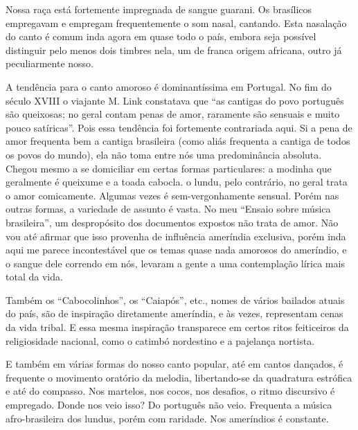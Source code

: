Nossa raça está fortemente impregnada de sangue guarani. Os brasílicos
empregavam e empregam frequentemente o som nasal, cantando. Esta
nasalação do canto é comum inda agora em quase todo o país, embora seja
possível distinguir pelo menos dois timbres nela, um de franca origem
africana, outro já peculiarmente nosso.

A tendência para o canto amoroso é dominantíssima em Portugal. No fim do
século XVIII o viajante M. Link constatava que ``as cantigas do povo
português são queixosas; no geral contam penas de amor, raramente são
sensuais e muito pouco satíricas''. Pois essa tendência foi fortemente
contrariada aqui. Si a pena de amor frequenta bem a cantiga brasileira
(como aliás frequenta a cantiga de todos os povos do mundo), ela não
toma entre nós uma predominância absoluta. Chegou mesmo a se domiciliar
em certas formas particulares: a modinha que geralmente é queixume e a
toada cabocla. o lundu, pelo contrário, no geral trata o amor
comicamente. Algumas vezes é sem-vergonhamente sensual. Porém nas outras
formas, a variedade de assunto é vasta. No meu ``Ensaio sobre música
brasileira'', um despropósito dos documentos expostos não trata de amor.
Não vou até afirmar que isso provenha de influência ameríndia exclusiva,
porém inda aqui me parece incontestável que os temas quase nada amorosos
do ameríndio, e o sangue dele correndo em nós, levaram a gente a uma
contemplação lírica mais total da vida.

Também os ``Cabocolinhos'', os ``Caiapós'', etc., nomes de vários
bailados atuais do país, são de inspiração diretamente ameríndia, e às
vezes, representam cenas da vida tribal. E essa mesma inspiração
transparece em certos ritos feiticeiros da religiosidade nacional, como
o catimbó nordestino e a pajelança nortista.

E também em várias formas do nosso canto popular, até em cantos
dançados, é frequente o movimento oratório da melodia, libertando-se da
quadratura estrófica e até do compasso. Nos martelos, nos cocos, nos
desafios, o ritmo discursivo é empregado. Donde nos veio isso? Do
português não veio. Frequenta a música afro-brasileira dos lundus, porém
com raridade. Nos ameríndios é constante.

